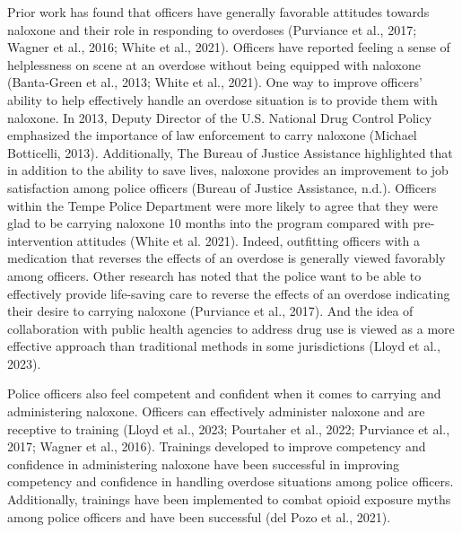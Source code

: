 Prior work has found that officers have generally favorable attitudes towards naloxone and their role in responding to overdoses (Purviance et al., 2017; Wagner et al., 2016; White et al., 2021). Officers have reported feeling a sense of helplessness on scene at an overdose without being equipped with naloxone (Banta-Green et al., 2013; White et al., 2021). One way to improve officers’ ability to help effectively handle an overdose situation is to provide them with naloxone. In 2013, Deputy Director of the U.S. National Drug Control Policy emphasized the importance of law enforcement to carry naloxone (Michael Botticelli, 2013). Additionally, The Bureau of Justice Assistance highlighted that in addition to the ability to save lives, naloxone provides an improvement to job satisfaction among police officers (Bureau of Justice Assistance, n.d.). Officers within the Tempe Police Department were more likely to agree that they were glad to be carrying naloxone 10 months into the program compared with pre-intervention attitudes (White et al. 2021). Indeed, outfitting officers with a medication that reverses the effects of an overdose is generally viewed favorably among officers. Other research has noted that the police want to be able to effectively provide life-saving care to reverse the effects of an overdose indicating their desire to carrying naloxone (Purviance et al., 2017). And the idea of collaboration with public health agencies to address drug use is viewed as a more effective approach than traditional methods in some jurisdictions (Lloyd et al., 2023). 

Police officers also feel competent and confident when it comes to carrying and administering naloxone. Officers can effectively administer naloxone and are receptive to training (Lloyd et al., 2023; Pourtaher et al., 2022; Purviance et al., 2017; Wagner et al., 2016). Trainings developed to improve competency and confidence in administering naloxone have been successful in improving competency and confidence in handling overdose situations among police officers. Additionally, trainings have been implemented to combat opioid exposure myths among police officers and have been successful (del Pozo et al., 2021). 

